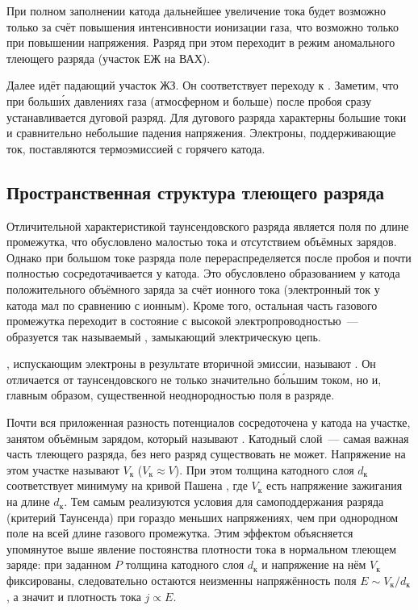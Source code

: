При полном заполнении катода дальнейшее увеличение тока будет возможно только за
счёт повышения интенсивности ионизации газа, что возможно только при повышении
напряжения. Разряд при этом переходит в режим аномального тлеющего разряда
(участок ЕЖ на ВАХ).

Далее идёт падающий участок ЖЗ. Он соответствует переходу к
. Заметим, что при больш\'{и}х давлениях газа
(атмосферном и больше) после пробоя сразу устанавливается дуговой разряд.
Для дугового разряда характерны большие токи и сравнительно небольшие падения
напряжения. Электроны, поддерживающие ток, поставляются термоэмиссией
с горячего катода.

\subsection*{Пространственная структура тлеющего разряда}
Отличительной характеристикой таунсендовского разряда
является  поля по длине промежутка, что обусловлено малостью тока
и отсутствием объёмных зарядов. Однако при большом токе разряда поле
перераспределяется после пробоя и почти полностью сосредотачивается у катода.
Это обусловлено образованием у катода положительного объёмного заряда за счёт
ионного тока (электронный ток у катода мал по сравнению с ионным). Кроме того,
остальная часть газового промежутка переходит в состояние с высокой
электропроводностью~--- образуется так называемый
, замыкающий электрическую цепь.

, испускающим электроны
в результате вторичной эмиссии, называют .
Он отличается от таунсендовского не только значительно б\'{о}льшим током,
но и, главным образом, существенной неоднородностью поля в разряде.

Почти вся приложенная разность потенциалов сосредоточена у катода на участке,
занятом объёмным зарядом, который называют .
Катодный слой~--- самая важная часть тлеющего разряда,
без него разряд существовать не может.
Напряжение на этом участке называют
 $V_{к}$ ($V_{к} \approx V$).
При этом толщина катодного слоя $d_{к}$ соответствует минимуму на кривой
Пашена , где $V_{к}$ есть напряжение зажигания
на длине $d_{к}$. Тем самым реализуются условия для самоподдержания разряда
(критерий Таунсенда) при гораздо меньших напряжениях, чем при однородном поле
на всей длине газового промежутка.
Этим эффектом объясняется упомянутое выше явление постоянства плотности
тока в нормальном тлеющем заряде: при заданном $P$ толщина катодного
слоя $d_{к}$ и напряжение на нём $V_{к}$ фиксированы, следовательно
остаются неизменны напряжённость поля $E\sim V_{к}/d_{к}$, а значит
и плотность тока $j\propto E$.

